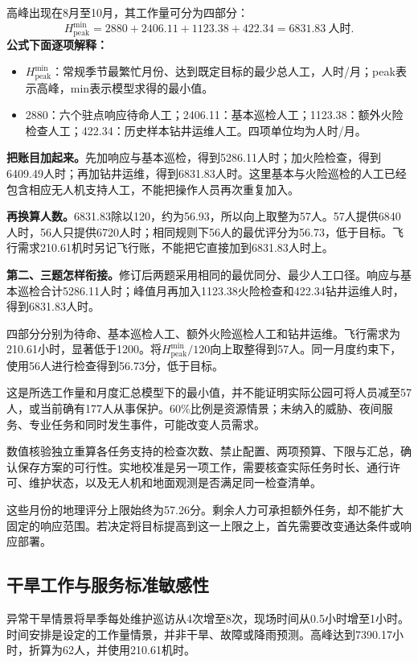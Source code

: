 \documentclass[12pt,a4paper]{article}
\numberwithin{equation}{section}
\begin{document}
高峰出现在8月至10月，其工作量可分为四部分：
\begin{equation}
H_{\mathrm{peak}}^{\min}
=2880+2406.11+1123.38+422.34
=6831.83\ \text{人时}.
\label{eq:peak}
\end{equation}
\noindent\textbf{公式下面逐项解释：}
\begin{itemize}
\item $H_{\mathrm{peak}}^{\min}$：常规季节最繁忙月份、达到既定目标的最少总人工，人时/月；peak表示高峰，min表示模型求得的最小值。
\item 2880：六个驻点响应待命人工；2406.11：基本巡检人工；1123.38：额外火险检查人工；422.34：历史样本钻井运维人工。四项单位均为人时/月。
\end{itemize}
\noindent\textbf{把账目加起来。}先加响应与基本巡检，得到5286.11人时；加火险检查，得到6409.49人时；再加钻井运维，得到6831.83人时。这里基本与火险巡检的人工已经包含相应无人机支持人工，不能把操作人员再次重复加入。

\noindent\textbf{再换算人数。}6831.83除以120，约为56.93，所以向上取整为57人。57人提供6840人时，56人只提供6720人时；相同规则下56人的最优评分为56.73，低于目标。飞行需求210.61机时另记飞行账，不能把它直接加到6831.83人时上。

\noindent\textbf{第二、三题怎样衔接。}修订后两题采用相同的最优同分、最少人工口径。响应与基本巡检合计5286.11人时；峰值月再加入1123.38火险检查和422.34钻井运维人时，得到6831.83人时。

四部分分别为待命、基本巡检人工、额外火险巡检人工和钻井运维。飞行需求为210.61小时，显著低于1200。将$H_{\mathrm{peak}}^{\min}/120$向上取整得到57人。同一月度约束下，使用56人进行检查得到56.73分，低于目标。

这是所选工作量和月度汇总模型下的最小值，并不能证明实际公园可将人员减至57人，或当前确有177人从事保护。60\%比例是资源情景；未纳入的威胁、夜间服务、专业任务和同时发生事件，可能改变人员需求。

数值核验独立重算各任务支持的检查次数、禁止配置、两项预算、下限与汇总，确认保存方案的可行性。实地校准是另一项工作，需要核查实际任务时长、通行许可、维护状态，以及无人机和地面观测是否满足同一检查清单。

这些月份的地理评分上限始终为57.26分。剩余人力可承担额外任务，却不能扩大固定的响应范围。若决定将目标提高到这一上限之上，首先需要改变通达条件或响应部署。
\clearpage

\subsection{干旱工作与服务标准敏感性}
异常干旱情景将旱季每处维护巡访从4次增至8次，现场时间从0.5小时增至1小时。时间安排是设定的工作量情景，并非干旱、故障或降雨预测。高峰达到7390.17小时，折算为62人，并使用210.61机时。
\end{document}
